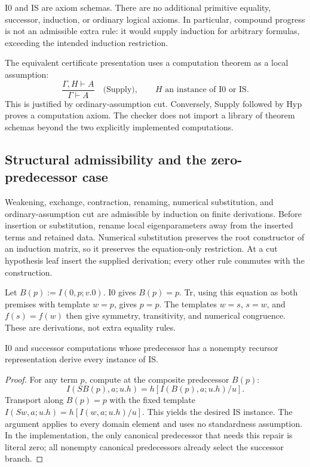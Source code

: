 I0 and IS are axiom schemas. There are no additional primitive equality,
successor, induction, or ordinary logical axioms. In particular, compound
progress is not an admissible extra rule: it would supply induction for
arbitrary formulas, exceeding the intended induction restriction.

The equivalent certificate presentation uses a computation theorem as a
local assumption:
\[
 \frac{\Gamma,H\vdash A}{\Gamma\vdash A}\quad\text{(Supply)},
 \qquad H\text{ an instance of I0 or IS}.
\]
This is justified by ordinary-assumption cut. Conversely, Supply followed
by Hyp proves a computation axiom. The checker does not import a library
of theorem schemas beyond the two explicitly implemented computations.

\subsection{Structural admissibility and the zero-predecessor case}

Weakening, exchange, contraction, renaming, numerical substitution, and
ordinary-assumption cut are admissible by induction on finite derivations.
Before insertion or substitution, rename local eigenparameters away from
the inserted terms and retained data. Numerical substitution preserves
the root constructor of an induction matrix, so it preserves the
equation-only restriction. At a cut hypothesis leaf insert the supplied
derivation; every other rule commutes with the construction.

Let $B(p):=I(0,p;v.0)$. I0 gives $B(p)=p$. Tr, using this equation as
both premises with template $w=p$, gives $p=p$. The templates $w=s$,
$s=w$, and $f(s)=f(w)$ then give symmetry, transitivity, and numerical
congruence. These are derivations, not extra equality rules.

\begin{lemma}
\label{up:boxing}
I0 and successor computations whose predecessor has a nonempty
recursor representation derive every instance of IS.
\end{lemma}
\begin{proof}
For any term $p$, compute at the composite predecessor $B(p)$:
\[
 I(SB(p),a;u.h)=h[I(B(p),a;u.h)/u].
\]
Transport along $B(p)=p$ with the fixed template
$I(Sw,a;u.h)=h[I(w,a;u.h)/u]$. This yields the desired IS instance.
The argument applies to every domain element and uses no standardness
assumption. In the implementation, the only canonical predecessor that
needs this repair is literal zero; all nonempty canonical predecessors
already select the successor branch.
\end{proof}

